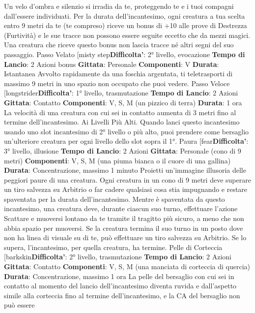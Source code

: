 \begin{multicols}{2}
Un velo d’ombra e silenzio si irradia da te, proteggendo
te e i tuoi compagni dall’essere individuati. Per la durata
dell’incantesimo, ogni creatura a tua scelta entro 9 metri
da te (te compreso) riceve un bonus di +10 alle prove di
Destrezza (Furtività) e le sue tracce non possono
essere seguite eccetto che da mezzi magici. Una
creatura che riceve questo bonus non lascia tracce né
altri segni del suo passaggio.
Passo Velato
[misty step\textbf{Difficolta'}:
2° livello, evocazione
\textbf{Tempo di Lancio}: 2 Azioni bonus
\textbf{Gittata}: Personale
\textbf{Componenti}: V
\textbf{Durata}: Istantanea
Avvolto rapidamente da una foschia argentata, ti
teletrasporti di massimo 9 metri in uno spazio non
occupato che puoi vedere.
Passo Veloce
[longstrider\textbf{Difficolta'}:
1° livello, trasmutazione
\textbf{Tempo di Lancio}: 2 Azioni
\textbf{Gittata}: Contatto
\textbf{Componenti}: V, S, M (un pizzico di terra)
\textbf{Durata}: 1 ora
La velocità di una creatura con cui sei in contatto
aumenta di 3 metri fino al termine dell’incantesimo.
Ai Livelli Più Alti. Quando lanci questo incantesimo
usando uno slot incantesimo di 2° livello o più alto, puoi
prendere come bersaglio un’ulteriore creatura per ogni
livello dello slot sopra il 1°.
Paura
[fear\textbf{Difficolta'}:
3° livello, illusione
\textbf{Tempo di Lancio}: 2 Azioni
\textbf{Gittata}: Personale (cono di 9 metri)
\textbf{Componenti}: V, S, M (una piuma bianca o il cuore di
una gallina)
\textbf{Durata}: Concentrazione, massimo 1 minuto
Proietti un’immagine illusoria delle peggiori paure di una
creatura. Ogni creatura in un cono di 9 metri deve
superare un tiro salvezza su Arbitrio o far cadere
qualsiasi cosa stia impugnando e restare spaventata
per la durata dell’incantesimo.
Mentre è spaventata da questo incantesimo, una
creatura deve, durante ciascun suo turno, effettuare
l’azione Scattare e muoversi lontano da te tramite il
tragitto più sicuro, a meno che non abbia spazio per
muoversi. Se la creatura termina il suo turno in un posto
dove non ha linea di visuale su di te, può effettuare un
tiro salvezza su Arbitrio. Se lo supera, l’incantesimo,
per quella creatura, ha termine.
Pelle di Corteccia
[barkskin\textbf{Difficolta'}:
2° livello, trasmutazione
\textbf{Tempo di Lancio}: 2 Azioni
\textbf{Gittata}: Contatto
\textbf{Componenti}: V, S, M (una manciata di corteccia di
quercia)
\textbf{Durata}: Concentrazione, massimo 1 ora
La pelle del bersaglio con cui sei in contatto al
momento del lancio dell’incantesimo diventa ruvida e
dall’aspetto simile alla corteccia fino al termine
dell’incantesimo, e la CA del bersaglio non può essere

\end{multicols}
